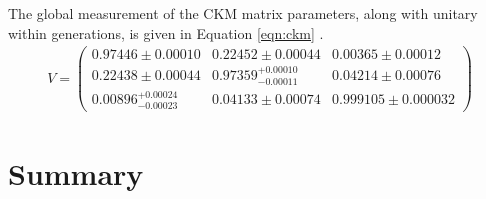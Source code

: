 The global measurement of the CKM matrix parameters, along with unitary within generations, is given in Equation \ref{eqn:ckm} \cite{pdg2019}.
\begin{equation}\begin{split}\label{eqn:ckm}
V=
\begin{pmatrix}
0.97446 \pm 0.00010 & 0.22452 \pm 0.00044 & 0.00365 \pm 0.00012 \\
0.22438 \pm 0.00044 & 0.97359^{+0.00010}_{-0.00011} & 0.04214 \pm 0.00076 \\
0.00896^{+0.00024}_{-0.00023} & 0.04133 \pm 0.00074 & 0.999105 \pm 0.000032
\end{pmatrix}
\end{split}\end{equation}


\section{Summary}

